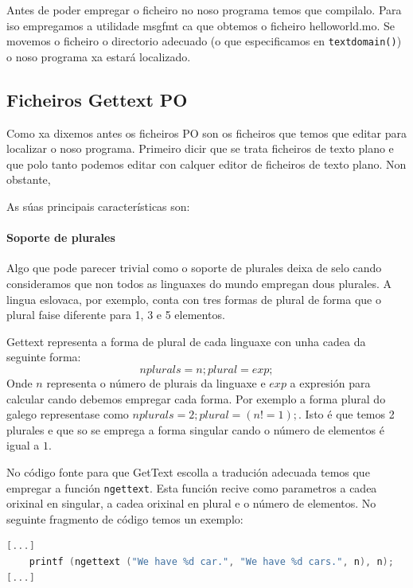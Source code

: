 Antes de poder empregar o ficheiro no noso programa temos que compilalo. Para iso empregamos a utilidade msgfmt ca que obtemos o ficheiro helloworld.mo. Se movemos o ficheiro o directorio adecuado (o que especificamos en \lstinline{textdomain()}) o noso programa xa estará localizado.


\subsection{Ficheiros Gettext PO}
Como xa dixemos antes os ficheiros PO son os ficheiros que temos que editar para localizar o noso programa. Primeiro dicir que se trata ficheiros de texto plano e que polo tanto podemos editar con calquer editor de ficheiros de texto plano. Non obstante,

As súas principais características son:

\paragraph{Soporte de plurales}
Algo que pode parecer trivial como o soporte de plurales deixa de selo cando consideramos que non todos as linguaxes do mundo empregan dous plurales. A lingua eslovaca, por exemplo, conta con tres formas de plural de forma que o plural faise diferente para 1, 3 e 5 elementos.

Gettext representa a forma de plural de cada linguaxe con unha cadea da seguinte forma: $$nplurals=n; plural=exp;$$ Onde $n$ representa o número de plurais da linguaxe e $exp$ a expresión para calcular cando debemos empregar cada forma. Por exemplo a forma plural do galego representase como $nplurals=2; plural=(n != 1);$. Isto é que temos 2 plurales e que so se emprega a forma singular cando o número de elementos é igual a $1$.

No código fonte para que GetText escolla a tradución adecuada temos que empregar a función \lstinline{ngettext}. Esta función recive como parametros a cadea orixinal en singular, a cadea orixinal en plural e o número de elementos. No seguinte fragmento de código temos un exemplo:

\begin{lstlisting}[language=C,caption=Plurais en GetText (Código Fonte).]
[...]
    printf (ngettext ("We have %d car.", "We have %d cars.", n), n);
[...]
\end{lstlisting}

